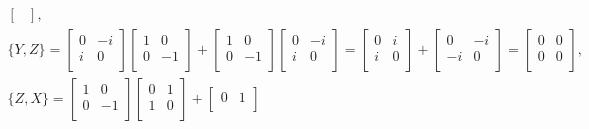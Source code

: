 \documentclass[a4paper,12pt]{article}
\begin{document}
\begin{gather}
\begin{bmatrix}
        \end{bmatrix}
        \textrm{,} \\
        \nonumber
        \{Y, Z\} =
        \begin{bmatrix}
            0 & -i\\
            i & 0\\
        \end{bmatrix}
        \begin{bmatrix}
            1 & 0\\
            0 & -1\\
        \end{bmatrix}
        +
        \begin{bmatrix}
            1 & 0\\
            0 & -1\\
        \end{bmatrix}
        \begin{bmatrix}
            0 & -i\\
            i & 0\\
        \end{bmatrix}
        =
        \begin{bmatrix}
            0 & i\\
            i & 0\\
        \end{bmatrix}
        +
        \begin{bmatrix}
            0 & -i\\
            -i & 0\\
        \end{bmatrix}
        =
        \begin{bmatrix}
            0 & 0\\
            0 & 0\\
        \end{bmatrix}
        \textrm{,} \\
        \{Z, X\} =
        \begin{bmatrix}
            1 & 0\\
            0 & -1\\
        \end{bmatrix}
        \begin{bmatrix}
            0 & 1\\
            1 & 0\\
        \end{bmatrix}
        +
        \begin{bmatrix}
            0 & 1\\

\end{bmatrix}
\end{gather}
\end{document}
